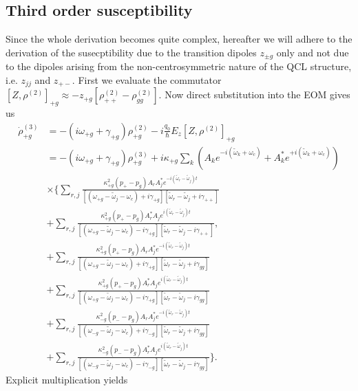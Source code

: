 \documentclass[preprint,secnumarabic,amssymb, nobibnotes, aip, prd]{revtex4-1}
\def\tw{\tilde{\omega}}
\def\tw{\tilde{\omega}}
\begin{document}
	\subsection{Third order susceptibility}
	
	Since the whole derivation becomes quite complex, hereafter we will adhere to the derivation of the susecptibility due to the transition dipoles $z_{\pm g}$ only and not due to the dipoles arising from the non-centrosymmetric nature of the QCL structure, i.e.  $z_{jj}$ and $z_{+-}$. First we evaluate the commutator $[Z,\rho^{(2)}]_{+g} \approx -z_{+g}[\rho_{++}^{(2)}-\rho_{gg}^{(2)}]$. Now direct substitution into the EOM gives us 
	\begin{align}
	\dot\rho_{+g}^{(3)} &= -(i\omega_{+g}+\gamma_{+g})\rho_{+g}^{(2)} -i\frac{q_0}{\hbar}E_z[Z,\rho^{(2)}]_{+g} \nonumber \\
	&= -(i\omega_{+g}+\gamma_{+g})\rho_{+g}^{(3)} +i\kappa_{+g} \sum_{k} \left ( A_k e^{-i(\tw_k+\omega_c)} + A_k^* e^{+i(\tw_k+\omega_c)}\right ) \nonumber \\
	& \times \Big \{ \sum_{r,j} \frac{\kappa_{+g}^2 (p_+-p_g) A_rA_j^*e^{-i(\tw_r-\tw_j)t}}{[( \omega_{+ g} - \tw_j-\omega_c) +i\gamma_{+ g}][ \tw_r-\tw_j +i\gamma_{++}]} \nonumber \\
	& + \sum_{r,j} \frac{\kappa_{+g}^2 (p_+-p_g) A_r^*A_je^{i(\tw_r-\tw_j)t}}{[( \omega_{+ g} - \tw_j-\omega_c) -i\gamma_{+ g}][ \tw_r-\tw_j -i\gamma_{++}]},\nonumber \\
	 &+ \sum_{r,j} \frac{\kappa_{+g}^2 (p_+-p_g) A_rA_j^*e^{-i(\tw_r-\tw_j)t}}{[( \omega_{+ g} - \tw_j-\omega_c) +i\gamma_{+ g}][ \tw_r-\tw_j +i\gamma_{gg}]} \nonumber \\
	 &+ \sum_{r,j} \frac{\kappa_{+g}^2 (p_+-p_g) A_r^*A_je^{i(\tw_r-\tw_j)t}}{[( \omega_{+ g} - \tw_j-\omega_c) -i\gamma_{+ g}][ \tw_r-\tw_j -i\gamma_{gg}]} \nonumber \\
	 &+ \sum_{r,j} \frac{\kappa_{-g}^2 (p_--p_g) A_rA_j^*e^{-i(\tw_r-\tw_j)t}}{[( \omega_{- g} - \tw_j-\omega_c) +i\gamma_{- g}][ \tw_r-\tw_j +i\gamma_{gg}]} \nonumber \\
	 &+ \sum_{r,j} \frac{\kappa_{-g}^2 (p_--p_g) A_r^*A_je^{i(\tw_r-\tw_j)t}}{[( \omega_{- g} - \tw_j-\omega_c) -i\gamma_{- g}][ \tw_r-\tw_j -i\gamma_{gg}]}
	\Big\}.
	\end{align}	
	Explicit multiplication yields
\end{document}
